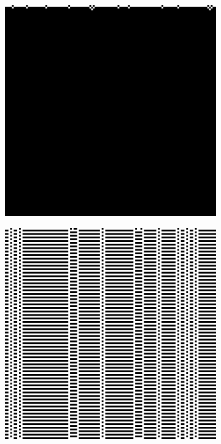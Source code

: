 \documentclass{elsarticle}
\begin{document}
\begin{multicols}{2}
\begin{figure}[H]
  \centering
  \begin{subfigure}[]{0.45\linewidth}
    \includegraphics[width=\linewidth]{class1.png}
    \caption{}
  \end{subfigure}
  \begin{subfigure}[]{0.45\linewidth}
    \includegraphics[width=\linewidth]{class2.png}

\end{subfigure}
\end{figure}
\end{multicols}
\end{document}
